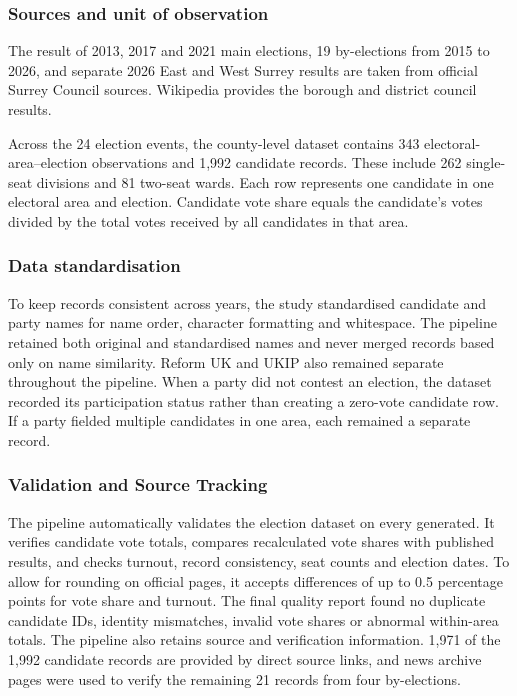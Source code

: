 \documentclass[final-report]{report-template}
\begin{document}
\subsubsection{Sources and unit of observation}

The result of 2013, 2017 and 2021 main elections, 19 by-elections from 2015 to 2026, and separate 2026 East and West Surrey results are taken from official Surrey Council sources. Wikipedia provides the borough and district council results.

Across the 24 election events, the county-level dataset contains 343 electoral-area–election observations and 1,992 candidate records. These include 262 single-seat divisions and 81 two-seat wards. Each row represents one candidate in one electoral area and election. Candidate vote share equals the candidate's votes divided by the total votes received by all candidates in that area.

\subsubsection{Data standardisation}
To keep records consistent across years, the study standardised candidate and party names for name order, character formatting and whitespace. The pipeline retained both original and standardised names and never merged records based only on name similarity. Reform UK and UKIP also remained separate throughout the pipeline. When a party did not contest an election, the dataset recorded its participation status rather than creating a zero-vote candidate row. If a party fielded multiple candidates in one area, each remained a separate record.

\subsubsection{Validation and Source Tracking}
The pipeline automatically validates the election dataset on every generated. It verifies candidate vote totals, compares recalculated vote shares with published results, and checks turnout, record consistency, seat counts and election dates. To allow for rounding on official pages, it accepts differences of up to 0.5 percentage points for vote share and turnout. The final quality report found no duplicate candidate IDs, identity mismatches, invalid vote shares or abnormal within-area totals. The pipeline also retains source and verification information. 1,971 of the 1,992 candidate records are provided by direct source links, and news archive pages were used to verify the remaining 21 records from four by-elections.
\end{document}
